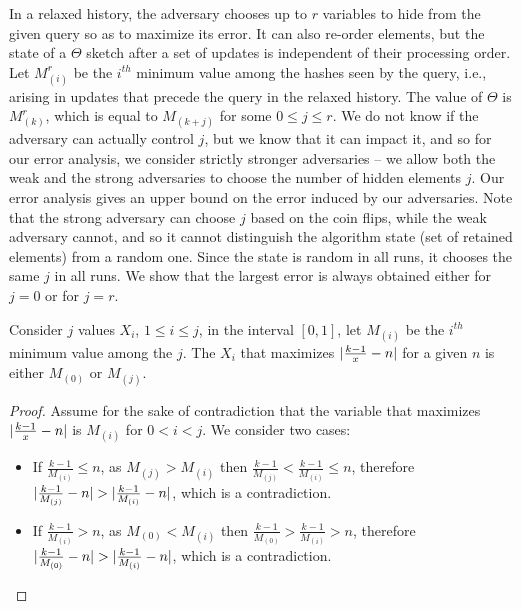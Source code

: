 In a relaxed history, the adversary chooses up to $r$ variables to hide from the given query so as to maximize its
error. It can also re-order elements, but the state of a $\Theta$ sketch after a set of updates
is independent of their processing order. Let $M^r_{(i)}$ be the $i^{th}$ minimum value among
the hashes seen by the query, i.e., arising in updates that precede the query in the relaxed history.
The value of $\Theta$ is $M^r_{(k)}$, which is equal to $M_{(k+j)}$ for some $0 \leq j \leq r$.
We do not know if the adversary can actually control $j$,
but we know that it can impact it, %
and so for our error analysis, we consider strictly stronger adversaries --
we allow both the weak and the strong adversaries to choose the number of hidden
elements $j$. Our error analysis gives an upper bound on the error induced by our adversaries.
Note that the strong adversary can choose $j$ based on the coin flips,
while the weak adversary cannot, and so it cannot distinguish the algorithm state (set of retained elements) from a random one. Since the state is random in all runs, it chooses the same $j$ in all runs.
We show that the largest error is always obtained either for $j=0$ or for $j=r$.
\begin{claim}
    Consider $j$ values $X_i$, $1 \leq i \leq j$, in the interval $[0,1]$,
    let $M_{(i)}$ be the $i^{th}$ minimum value
    among the $j$. The $X_i$ that maximizes $\lvert\frac{k-1}{x}-n\rvert$ for a given $n$
    is either $M_{(0)}$ or $M_{(j)}$.
    \label{fc-claim:max-val}    
\end{claim}
\begin{proof}
    Assume for the sake of contradiction that the variable that
    maximizes $\lvert\frac{k-1}{x}-n\rvert$ is $M_{(i)}$ for $0<i<j$.  We consider two cases:
    \begin{itemize}
    \item If $\frac{k-1}{M_{(i)}} \leq n$, as $M_{(j)} > M_{(i)}$ then $\frac{k-1}{M_{(j)}} < \frac{k-1}{M_{(i)}} \leq n$,
    therefore $\lvert\frac{k-1}{M_{(j)}}-n\rvert > \lvert\frac{k-1}{M_{(i)}}-n\rvert$, which is a contradiction.
    \item If $\frac{k-1}{M_{(i)}} > n$, as $M_{(0)} < M_{(i)}$ then $\frac{k-1}{M_{(0)}} > \frac{k-1}{M_{(i)}} > n$,
    therefore $\lvert\frac{k-1}{M_{(0)}}-n\rvert > \lvert\frac{k-1}{M_{(i)}}-n\rvert$, which is a contradiction.
    \end{itemize}
\end{proof}



